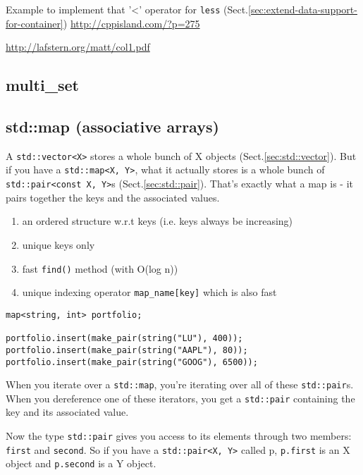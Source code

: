 Example to implement that '<' operator for \verb!less! (Sect.\ref{sec:extend-data-support-for-container})
\url{http://cppisland.com/?p=275}


\url{http://lafstern.org/matt/col1.pdf}

\subsection{multi\_set}
\label{sec:multiset}


\subsection{std::map (associative arrays)}
\label{sec:map}
\label{sec:std::map}

A \verb!std::vector<X>! stores a whole bunch of X objects
(Sect.\ref{sec:std::vector}).
But if you have a \verb!std::map<X, Y>!, what it actually stores is a whole
bunch of \verb!std::pair<const X, Y>!s (Sect.\ref{sec:std::pair}). That's
exactly what a map is - it pairs together the keys and the associated values.
\begin{enumerate}
  \item an ordered structure w.r.t keys (i.e. keys always be increasing)
  
  \item unique keys only
  
  \item fast \verb!find()! method (with O(log n))
  
  \item unique indexing operator \verb!map_name[key]! which is also fast
\end{enumerate}


\begin{lstlisting}
map<string, int> portfolio;

portfolio.insert(make_pair(string("LU"), 400));
portfolio.insert(make_pair(string("AAPL"), 80));
portfolio.insert(make_pair(string("GOOG"), 6500));
\end{lstlisting}

When you iterate over a \verb!std::map!, you're iterating over all of these
\verb!std::pair!s. When you dereference one of these iterators, you get a
\verb!std::pair! containing the key and its associated value.

Now the type \verb!std::pair! gives you access to its elements through two
members:
\verb!first! and \verb!second!. So if you have a \verb!std::pair<X, Y>! called
p, \verb!p.first! is an X object and \verb!p.second! is a Y object.

